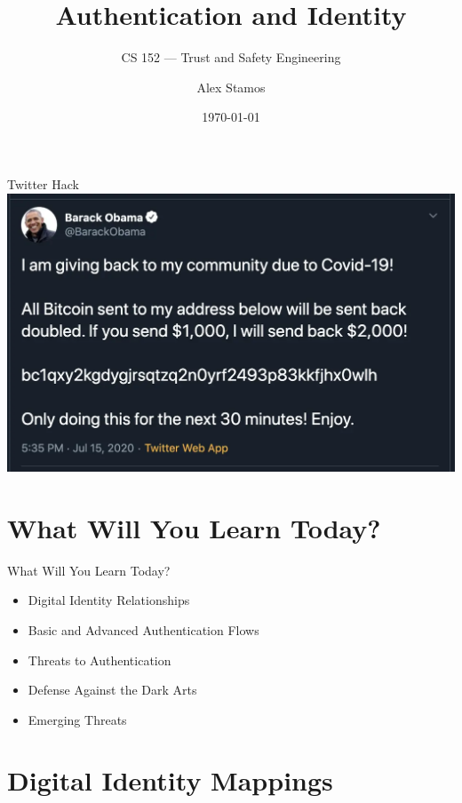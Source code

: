 \documentclass[nobackground,dvipsnames,table,aspectratio=169]{beamer}
\title{Authentication and Identity}
\subtitle{CS 152 --- Trust and Safety Engineering}
\author[A. Stamos]{Alex Stamos}
\institute[Stanford University]{Stanford Cyber Policy Center}
\date[2022]{\today}
\begin{document}
\begin{frame}
    \titlepage
\end{frame}

\begin{frame}{Twitter Hack}
    \includegraphics[width=\textwidth]{thanks-obama}
\end{frame}


\section{What Will You Learn Today?}

\begin{frame}{What Will You Learn Today?}
    \Large
    \begin{itemize}
        \item Digital Identity Relationships
        \item Basic and Advanced Authentication Flows
        \item Threats to Authentication
        \item Defense Against the Dark Arts
        \item Emerging Threats
    \end{itemize}
\end{frame}

\section{Digital Identity Mappings}
\end{document}
